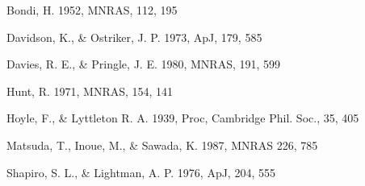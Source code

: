 \documentclass{emulateapj}
\begin{document}
\begin{thebibliography}{}

Bondi, H. 1952, MNRAS, 112, 195

Davidson, K., \& Ostriker, J. P. 1973, ApJ, 179, 585

Davies, R. E., \& Pringle, J. E. 1980, MNRAS, 191, 599

Hunt, R. 1971, MNRAS, 154, 141

Hoyle, F., \& Lyttleton R. A. 1939, Proc, Cambridge Phil. Soc., 35, 405

Matsuda, T., Inoue, M., \& Sawada, K. 1987, MNRAS 226, 785

Shapiro, S. L., \& Lightman, A. P. 1976, ApJ, 204, 555

\end{thebibliography}
\clearpage
\end{document}
